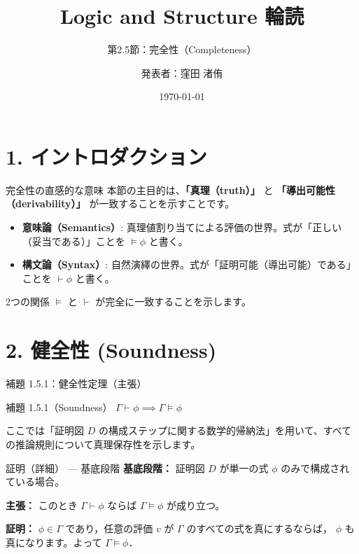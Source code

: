 \documentclass[unicode,10pt]{beamer}
\title{Logic and Structure 輪読}
\subtitle{第2.5節：完全性（Completeness）}
\author{発表者：窪田 渚侑}
\date{\today}
\begin{document}
\begin{frame}[plain]
    \titlepage
\end{frame}

\section{1. イントロダクション}

\begin{frame}{完全性の直感的な意味}
    本節の主目的は、\textbf{「真理（truth）」} と \textbf{「導出可能性（derivability）」} が一致することを示すことです。

    \begin{itemize}
        \item \textbf{意味論（Semantics）}: 真理値割り当てによる評価の世界。式が「正しい（妥当である）」ことを $\models \phi$ と書く。
        \item \textbf{構文論（Syntax）}: 自然演繹の世界。式が「証明可能（導出可能）である」ことを $\vdash \phi$ と書く。
    \end{itemize}
    \vspace{1em}
    2つの関係 $\models$ と $\vdash$ が完全に一致することを示します。
\end{frame}

\section{2. 健全性 (Soundness)}

\begin{frame}{補題 1.5.1：健全性定理（主張）}
    \begin{block}{補題 1.5.1（Soundness）}
        $\Gamma \vdash \phi \implies \Gamma \models \phi$
    \end{block}
    \vspace{0.5em}
    ここでは「証明図 $D$ の構成ステップに関する数学的帰納法」を用いて、すべての推論規則について真理保存性を示します。
\end{frame}

\begin{frame}{証明（詳細） — 基底段階}
    \textbf{基底段階：} 証明図 $D$ が単一の式 $\phi$ のみで構成されている場合。

    \textbf{主張：} このとき $\Gamma \vdash \phi$ ならば $\Gamma \models \phi$ が成り立つ。

    \textbf{証明：} $\phi\in\Gamma$ であり，任意の評価 $v$ が $\Gamma$ のすべての式を真にするならば， $\phi$ も真になります。よって $\Gamma\models\phi$．
\end{frame}
\end{document}
